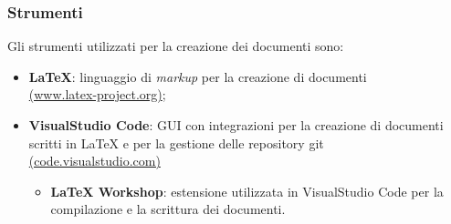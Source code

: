 \subsubsection{Strumenti}
Gli strumenti utilizzati per la creazione dei documenti sono:
\begin{itemize}
	\item \textbf{LaTeX}: linguaggio di \textit{markup} per la creazione di
	      documenti \\
	      \href{https://www.latex-project.org/}{(www.latex-project.org)};
	\item \textbf{VisualStudio Code}: GUI con integrazioni per la creazione di
	      documenti scritti in LaTeX e per la gestione delle repository git \\
	      \href{https://code.visualstudio.com/}{(code.visualstudio.com)}
	      \begin{itemize}
		      \item \textbf{LaTeX Workshop}: estensione utilizzata in
		            VisualStudio Code per la compilazione e la scrittura dei
		            documenti.
	      \end{itemize}
\end{itemize}
